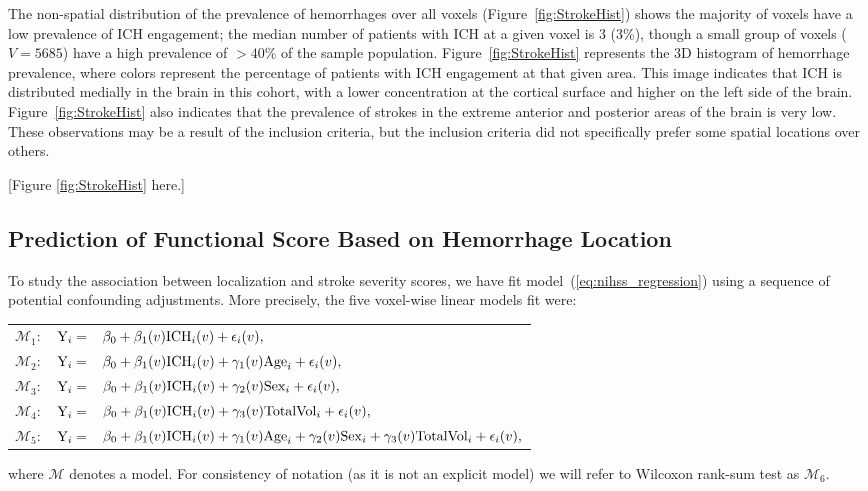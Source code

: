 \documentclass[10pt]{article}\usepackage[]{graphicx}\usepackage[]{color}
\begin{document}
The non-spatial distribution of the prevalence of hemorrhages over all voxels (Figure~\ref{fig:StrokeHist}\protect{}) shows the majority of voxels have a low prevalence of ICH engagement; the median number of patients with ICH at a given voxel is 3 (3\%), though a small group of voxels ($V = 5685$) have a high prevalence of $> 40\%$ of the sample population.  Figure~\ref{fig:StrokeHist}\protect{} represents the 3D histogram of hemorrhage prevalence, where colors represent the percentage of patients with ICH engagement at that given area.  This image indicates that ICH is
distributed medially in the brain in this cohort, with a lower concentration
at the cortical surface and higher on the left side of the brain.  Figure~\ref{fig:StrokeHist}\protect{} also indicates that the prevalence of strokes in the extreme anterior and posterior areas of the brain is very low.  
These observations may be a result of the inclusion criteria, but the inclusion criteria \citep{mould_minimally_2013} did not specifically prefer some spatial locations over others. 

[Figure \ref{fig:StrokeHist} here.]


\subsection{Prediction of Functional Score Based on Hemorrhage Location}

To study the association between localization and stroke severity scores, we have fit model~(\ref{eq:nihss_regression}) using a sequence of  potential confounding adjustments. More precisely, the five voxel-wise linear models fit were:

\vspace{0.1in}
\begin{tabular}{rll}
\noindent $\mathcal{M}_1:$ & $ {\rm Y}_i =$ & \hspace{-0.18in} $\beta_0+\beta_1(v) {\rm ICH}_i(v) + \epsilon_{i}(v), $\\
$\mathcal{M}_2:$ & $ {\rm Y}_i = $ & \hspace{-0.18in} $ \beta_0+\beta_1(v) {\rm ICH}_i(v) + \gamma_1(v){\rm Age}_i + \epsilon_{i}(v), $\\
$\mathcal{M}_3:$ & $ {\rm Y}_i = $ & \hspace{-0.18in} $ \beta_0+\beta_1(v) {\rm ICH}_i(v) + \gamma_2(v){\rm Sex}_i + \epsilon_{i}(v), $\\
$\mathcal{M}_4:$ &$  {\rm Y}_i = $ & \hspace{-0.18in} $ \beta_0+\beta_1(v) {\rm ICH}_i(v) + \gamma_3(v){\rm TotalVol}_i + \epsilon_{i}(v),$ \\
$\mathcal{M}_5:$ &$  {\rm Y}_i = $ & \hspace{-0.18in} $ \beta_0+\beta_1(v) {\rm ICH}_i(v) + \gamma_1(v){\rm Age}_i  +\gamma_2(v){\rm Sex}_i +\gamma_3(v){\rm TotalVol}_i + \epsilon_{i}(v),$ \\
\end{tabular}
\vspace{0.1in}
\newline
where $\mathcal{M}$ denotes a model.  For consistency of notation (as it is not an explicit model) we will refer to Wilcoxon rank-sum test as $\mathcal{M}_6$.
\end{document}
